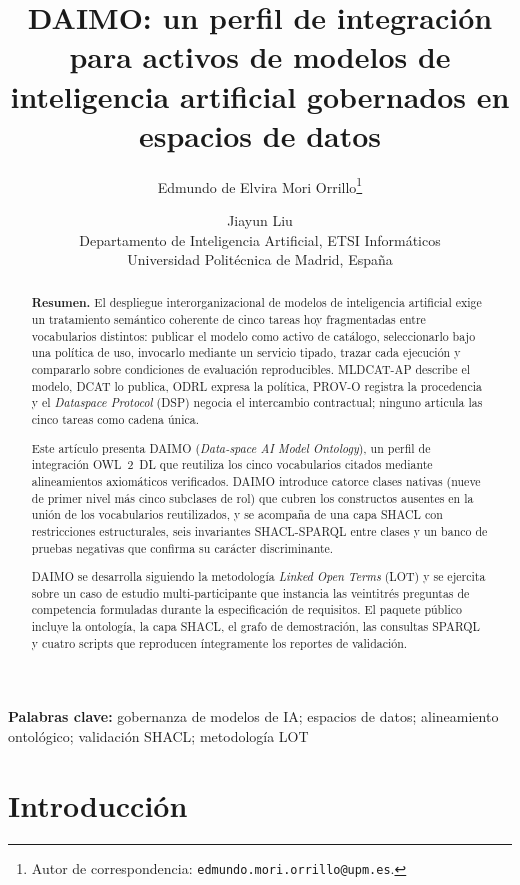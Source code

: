 \documentclass[11pt,a4paper]{article}
\title{DAIMO: un perfil de integración para activos de modelos de inteligencia artificial gobernados en espacios de datos}
\author{Edmundo de Elvira Mori Orrillo\thanks{Autor de correspondencia: \texttt{edmundo.mori.orrillo@upm.es}.} \and Jiayun Liu \\[0.5em]
\normalsize Departamento de Inteligencia Artificial, ETSI Informáticos\\
\normalsize Universidad Politécnica de Madrid, España}
\date{}
\providecommand{\keywords}[1]{\medskip\noindent\textbf{Palabras clave:} #1}
\begin{document}
\maketitle

\begin{abstract}
\noindent\textbf{Resumen.}
El despliegue interorganizacional de modelos de inteligencia artificial exige un tratamiento semántico coherente de cinco tareas hoy fragmentadas entre vocabularios distintos: publicar el modelo como activo de catálogo, seleccionarlo bajo una política de uso, invocarlo mediante un servicio tipado, trazar cada ejecución y compararlo sobre condiciones de evaluación reproducibles. MLDCAT-AP describe el modelo, DCAT lo publica, ODRL expresa la política, PROV-O registra la procedencia y el \emph{Dataspace Protocol} (DSP) negocia el intercambio contractual; ninguno articula las cinco tareas como cadena única.

Este artículo presenta DAIMO (\emph{Data-space AI Model Ontology}), un perfil de integración OWL~2~DL que reutiliza los cinco vocabularios citados mediante alineamientos axiomáticos verificados. DAIMO introduce catorce clases nativas (nueve de primer nivel más cinco subclases de rol) que cubren los constructos ausentes en la unión de los vocabularios reutilizados, y se acompaña de una capa SHACL con restricciones estructurales, seis invariantes SHACL-SPARQL entre clases y un banco de pruebas negativas que confirma su carácter discriminante.

DAIMO se desarrolla siguiendo la metodología \emph{Linked Open Terms} (LOT) y se ejercita sobre un caso de estudio multi-participante que instancia las veintitrés preguntas de competencia formuladas durante la especificación de requisitos. El paquete público incluye la ontología, la capa SHACL, el grafo de demostración, las consultas SPARQL y cuatro scripts que reproducen íntegramente los reportes de validación.
\end{abstract}

\keywords{gobernanza de modelos de IA; espacios de datos; alineamiento ontológico; validación SHACL; metodología LOT}

\maketitle

\section{Introducción}\label{sec:intro}
\end{document}
